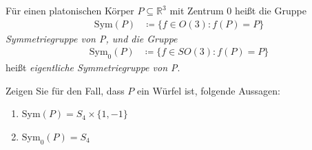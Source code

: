 \begin{assignment} 
  Für einen platonischen Körper \( P \subseteq \mathbb{R}^3 \) mit Zentrum \( 0 \) heißt die Gruppe
  \begin{align*}
    \text{Sym}(P) &\coloneqq \{ f \in O(3): f(P) = P \} 
  \end{align*} 
  \emph{Symmetriegruppe von P, und die Gruppe}
  \begin{align*}
    \text{Sym}_0(P) &\coloneqq \{ f \in SO(3): f(P) = P \}
  \end{align*}
  heißt \emph{eigentliche Symmetriegruppe von P}.
  
  Zeigen Sie für den Fall, dass \( P \) ein Würfel ist, folgende Aussagen: \\
  \begin{enumerate}[label= (\alph*)] 
    \item \( \text{Sym}(P) = S_4 \times \{ 1, -1 \} \) 
    \item \( \text{Sym}_0(P) = S_4 \) 
  \end{enumerate}
\end{assignment}
